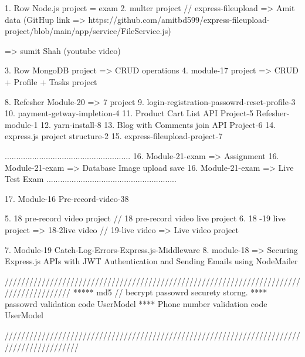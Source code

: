 1. Row Node.js project = exam
2. multer project // express-fileupload  
   =>  Amit data (GitHup link => https://github.com/amitbd599/express-fileupload-project/blob/main/app/service/FileService.js)

   => sumit Shah (youtube video)

3. Row MongoDB project => CRUD operations
4. module-17 project => CRUD + Profile + Tasks project

8. Refesher Module-20 => 7 project
9. login-registration-passowrd-reset-profile-3
10. payment-getway-impletion-4 
11. Product Cart List API Project-5 Refesher-module-1 
12. yarn-install-8
13. Blog with Comments join API Project-6
14. express.js project structure-2
15. express-fileupload-project-7

.......................................................
16. Module-21-exam => Assignment
16. Module-21-exam => Database Image upload save
16. Module-21-exam => Live Test Exam
.........................................................

17. Module-16 Pre-record-video-38

5. 18 pre-record video project //  18 pre-record video live project
6. 18 -19 live project => 18-2live video // 19-live video => Live video project

7. Module-19 Catch-Log-Errors-Express.js-Middleware
8. module-18 => Securing Express.js APIs with JWT Authentication and Sending Emails using NodeMailer 


////////////////////////////////////////////////////////////////////////////////////////
***** md5 // becrypt passowrd securety storng.
**** passowrd validation code UserModel
**** Phone number validation code UserModel

//////////////////////////////////////////////////////////////////////////////////////////